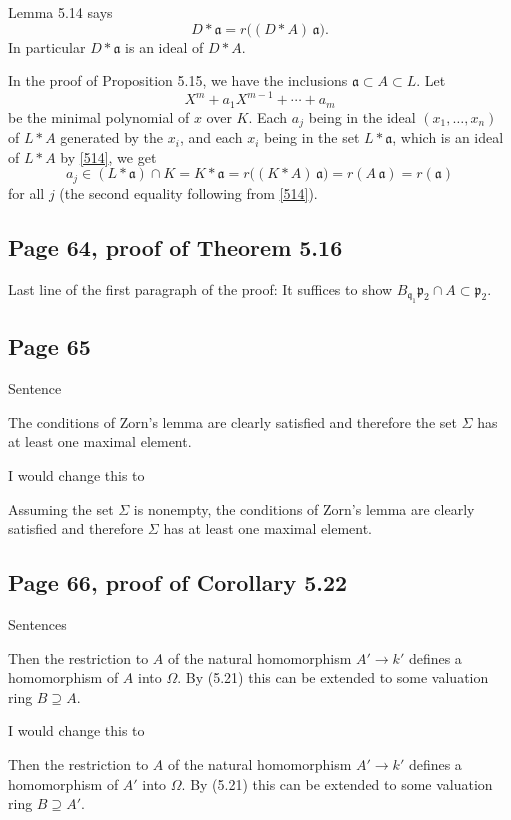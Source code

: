 \documentclass[parskip=half,fontsize=12pt]{scrartcl}%
\newcommand{\mf}{\mathfrak}
\newcommand{\ppp}{\mf p}
\begin{document}
Lemma 5.14 says
\begin{equation}\label{514}
D*\mf a=r\Big((D*A)\,\mf a\Big).
\end{equation}
In particular $D*\mf a$ is an ideal of $D*A$. 

In the proof of Proposition 5.15, we have the inclusions $\mf a\subset A\subset L$. Let 
$$
X^m+a_1X^{m-1}+\cdots+a_m
$$ 
be the minimal polynomial of $x$ over $K$. Each $a_j$ being in the ideal $(x_1,\dots,x_n)$ of $L*A$ generated by the $x_i$, and each $x_i$ being in the set $L*\mf a$, which is an ideal of $L*A$ by \eqref{514}, we get 
$$
a_j\in(L*\mf a)\cap K=K*\mf a=r\Big((K*A)\,\mf a\Big)=r(A\,\mf a)=r(\mf a)
$$ 
for all $j$ (the second equality following from \eqref{514}).

\subsection{Page 64, proof of Theorem 5.16}%

Last line of the first paragraph of the proof: It suffices to show $B_{\mf q_1}\ppp_2\cap A\subset\ppp_2$.

\subsection{Page 65}%

Sentence

The conditions of Zorn's lemma are clearly satisfied and therefore the set $\Sigma$ has at least one maximal element.

I would change this to 

Assuming the set $\Sigma$ is nonempty, the conditions of Zorn's lemma are clearly satisfied and therefore $\Sigma$ has at least one maximal element.

\subsection{Page 66, proof of Corollary 5.22}%

Sentences

Then the restriction to $A$ of the natural homomorphism $A'\to k'$ defines a homomorphism of $A$ into $\Omega$. By (5.21) this can be extended to some valuation ring $B\supseteq A$.

I would change this to 

Then the restriction to $A$ of the natural homomorphism $A'\to k'$ defines a homomorphism of $A'$ into $\Omega$. By (5.21) this can be extended to some valuation ring $B\supseteq A'$.
\end{document}
